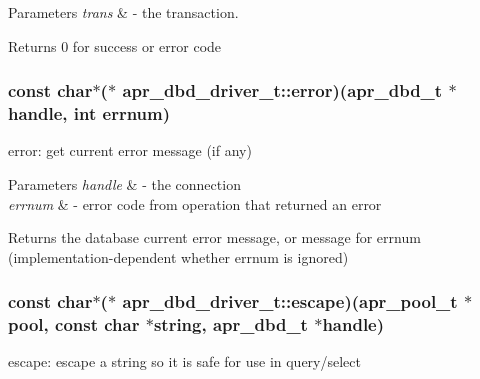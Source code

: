 \begin{DoxyParams}{Parameters}
{\em trans} & -\/ the transaction. \\
\hline
\end{DoxyParams}
\begin{DoxyReturn}{Returns}
0 for success or error code 
\end{DoxyReturn}
\hypertarget{structapr__dbd__driver__t_a0f43ae627fef47fb6eb2d5a6bca07c65}{
\subsubsection[{error}]{\setlength{\rightskip}{0pt plus 5cm}const char$\ast$($\ast$ apr\-\_\-dbd\-\_\-driver\-\_\-t\-::error)(apr\-\_\-dbd\-\_\-t $\ast$handle, int errnum)}}\label{structapr__dbd__driver__t_a0f43ae627fef47fb6eb2d5a6bca07c65}
error\-: get current error message (if any)


\begin{DoxyParams}{Parameters}
{\em handle} & -\/ the connection \\
\hline
{\em errnum} & -\/ error code from operation that returned an error \\
\hline
\end{DoxyParams}
\begin{DoxyReturn}{Returns}
the database current error message, or message for errnum (implementation-\/dependent whether errnum is ignored) 
\end{DoxyReturn}
\hypertarget{structapr__dbd__driver__t_aee7333b952c8e7fca206d10b5cf673fc}{
\subsubsection[{escape}]{\setlength{\rightskip}{0pt plus 5cm}const char$\ast$($\ast$ apr\-\_\-dbd\-\_\-driver\-\_\-t\-::escape)(apr\-\_\-pool\-\_\-t $\ast$pool, const char $\ast$string, apr\-\_\-dbd\-\_\-t $\ast$handle)}}\label{structapr__dbd__driver__t_aee7333b952c8e7fca206d10b5cf673fc}
escape\-: escape a string so it is safe for use in query/select


